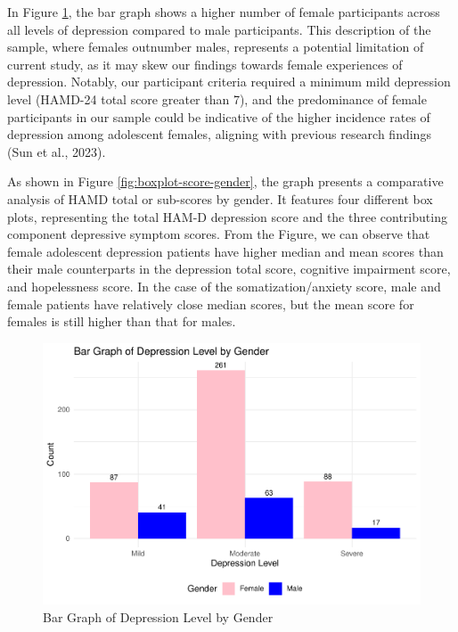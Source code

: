 \documentclass[
  man,floatsintext]{apa6}
\begin{document}
In Figure \ref{fig:gender-depression-bar}, the bar graph shows a higher number of female participants across all levels of depression compared to male participants. This description of the sample, where females outnumber males, represents a potential limitation of current study, as it may skew our findings towards female experiences of depression. Notably, our participant criteria required a minimum mild depression level (HAMD-24 total score greater than 7), and the predominance of female participants in our sample could be indicative of the higher incidence rates of depression among adolescent females, aligning with previous research findings (Sun et al., 2023).

As shown in Figure \ref{fig:boxplot-score-gender}, the graph presents a comparative analysis of HAMD total or sub-scores by gender. It features four different box plots, representing the total HAM-D depression score and the three contributing component depressive symptom scores. From the Figure, we can observe that female adolescent depression patients have higher median and mean scores than their male counterparts in the depression total score, cognitive impairment score, and hopelessness score. In the case of the somatization/anxiety score, male and female patients have relatively close median scores, but the mean score for females is still higher than that for males.

\begin{figure}
\centering
\includegraphics{final_files/figure-latex/gender-depression-bar-1.pdf}
\caption{\label{fig:gender-depression-bar}Bar Graph of Depression Level by Gender}
\end{figure}
\end{document}
